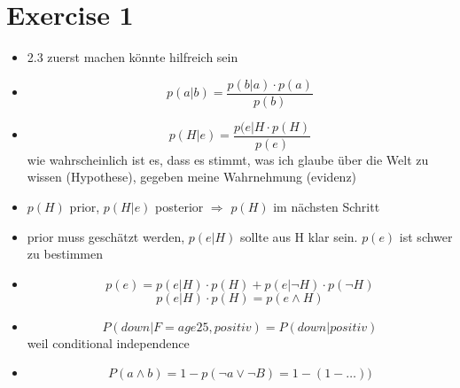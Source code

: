 \documentclass[fleqn,12pt]{scrartcl}
\newcommand{\blattn}{Exercise 1}
\begin{document}
\section*{\blattn}
\setcounter{section}{1}
\begin{itemize}
	\item
2.3 zuerst machen könnte hilfreich sein
\item
$$
p(a|b) = \frac{p(b|a)\cdot p(a)}{p(b)}
$$

\item
$$p(H|e) = \frac{p(e|H \cdot p(H)}{p(e)}
$$
wie wahrscheinlich ist es, dass es stimmt, was ich glaube über die Welt zu wissen (Hypothese), gegeben meine Wahrnehmung (evidenz)

\item
$p(H)$ prior, $p(H|e)$ posterior $\Rightarrow$ $p(H)$ im nächsten Schritt

\item
prior muss geschätzt werden, $p(e|H)$ sollte aus H klar sein. $p(e)$ ist schwer zu bestimmen
\item
	$$p(e) = p(e|H) \cdot p(H) + p(e|\neg H) \cdot p(\neg H)$$
	$$p(e|H) \cdot p(H) = p(e\wedge H)$$
\item
	$$P(down | F=age25, positiv) = P(down | positiv)$$ weil conditional independence
\item
	$$P(a\wedge b) = 1 - p(\neg a \vee \neg B) = 1 - (1 -  \dots ) )$$
\end{itemize}
\end{document}
